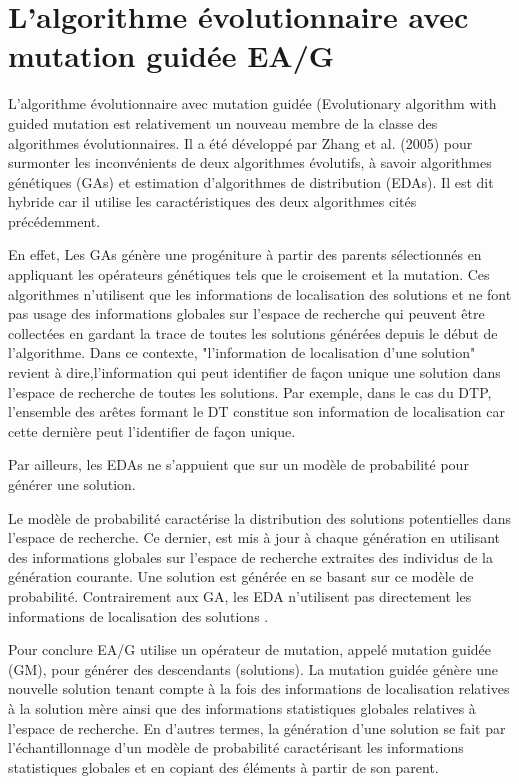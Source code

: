 \section{L’algorithme évolutionnaire avec mutation guidée EA/G}
L’algorithme évolutionnaire avec mutation guidée (Evolutionary algorithm with guided mutation \cite{zhang2005evolutionary} est relativement un nouveau membre de la classe des algorithmes évolutionnaires. Il a été développé par Zhang et al. (2005) \cite{zhang2005evolutionary} pour surmonter les inconvénients de deux algorithmes évolutifs, à savoir algorithmes génétiques (GAs) et estimation d'algorithmes de distribution (EDAs). Il est dit hybride car il utilise les caractéristiques des deux algorithmes cités précédemment. 

En effet, Les GAs génère une progéniture à partir des parents sélectionnés en appliquant les opérateurs génétiques tels que le croisement et la mutation. Ces algorithmes  n’utilisent que les informations de localisation des solutions et ne font pas usage des informations globales sur l’espace de recherche qui peuvent être collectées en gardant la trace de toutes les solutions générées depuis le début de l’algorithme. Dans ce contexte, "l’information de localisation d’une solution" revient à dire,l’information qui peut identifier de façon unique une solution dans l’espace de recherche de toutes les solutions. Par exemple, dans le cas du DTP, l’ensemble des arêtes formant le DT constitue son information de localisation car cette dernière peut l’identifier de façon unique.

Par ailleurs, les EDAs ne s’appuient que sur un modèle de probabilité pour générer une solution.

Le modèle de probabilité caractérise la distribution des solutions potentielles dans l’espace de recherche. Ce dernier, est mis à jour à chaque génération en utilisant des informations globales sur  l’espace de recherche extraites des individus de la génération courante. Une solution est générée en se basant sur ce modèle de probabilité. Contrairement aux GA, les EDA n'utilisent pas directement les informations de localisation des solutions \cite{chaurasia2016hybrid}. 

Pour conclure EA/G utilise un opérateur de mutation, appelé mutation guidée (GM), pour générer des descendants (solutions). La mutation guidée génère une nouvelle solution tenant compte à la fois des informations de localisation relatives à la solution mère ainsi que des informations statistiques globales relatives à l'espace de recherche. En d'autres termes, la génération d’une solution se fait par l’échantillonnage d’un modèle de probabilité caractérisant les informations statistiques globales et en copiant des éléments à partir de son parent.


